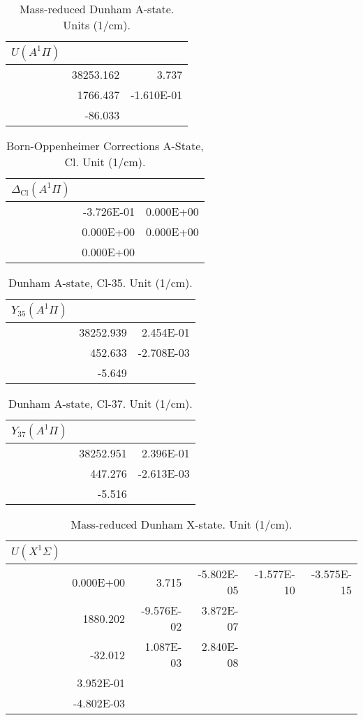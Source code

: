 \begin{table}
\begin{tabular}{crr}
\toprule
$U (A^1\Pi)$\\ \midrule 
& 38253.162 & 3.737 \\
& 1766.437 & -1.610E-01 \\
& -86.033 \\
\bottomrule
\end{tabular}\caption{Mass-reduced Dunham A-state. Units (1/cm).}\end{table}
\begin{table}
\begin{tabular}{crr}
\toprule
$\Delta_\textrm{Cl} (A^1\Pi)$\\ \midrule 
& -3.726E-01 & 0.000E+00 \\
& 0.000E+00 & 0.000E+00 \\
& 0.000E+00 \\
\bottomrule
\end{tabular}\caption{Born-Oppenheimer Corrections A-State, Cl. Unit (1/cm).}\end{table}
\begin{table}
\begin{tabular}{crr}
\toprule
$Y_{35} (A^1\Pi)$\\ \midrule 
& 38252.939 & 2.454E-01 \\
& 452.633 & -2.708E-03 \\
& -5.649 \\
\bottomrule
\end{tabular}\caption{Dunham A-state, Cl-35. Unit (1/cm).}\end{table}
\begin{table}
\begin{tabular}{crr}
\toprule
$Y_{37} (A^1\Pi)$\\ \midrule 
& 38252.951 & 2.396E-01 \\
& 447.276 & -2.613E-03 \\
& -5.516 \\
\bottomrule
\end{tabular}\caption{Dunham A-state, Cl-37. Unit (1/cm).}\end{table}
\begin{table}
\begin{tabular}{crrrrr}
\toprule
$U (X^1\Sigma)$\\ \midrule 
& 0.000E+00 & 3.715 & -5.802E-05 & -1.577E-10 & -3.575E-15 \\
& 1880.202 & -9.576E-02 & 3.872E-07 \\
& -32.012 & 1.087E-03 & 2.840E-08 \\
& 3.952E-01 \\
& -4.802E-03 \\
\bottomrule
\end{tabular}\caption{Mass-reduced Dunham X-state. Unit (1/cm).}\end{table}
